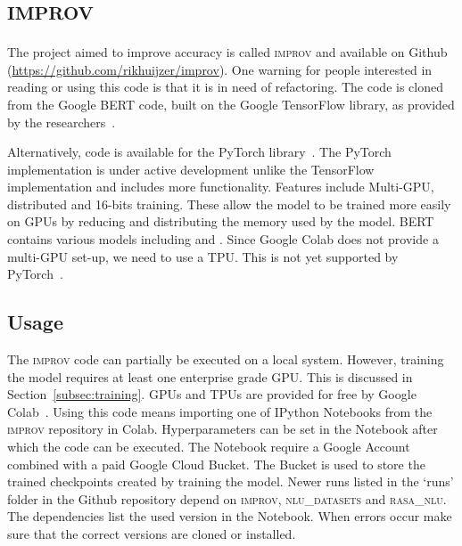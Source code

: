 \chapter{\textsc{improv}}
\label{ch:improv}
The project aimed to improve accuracy is called \textsc{improv} and available on Github (\url{https://github.com/rikhuijzer/improv}).
One warning for people interested in reading or using this code is that it is in need of refactoring.
The code is cloned from the Google BERT code, built on the Google TensorFlow library, as provided by the researchers~\citep{devlin2018github}.

Alternatively, code is available for the PyTorch library~\citep{wolf2018github}.
The PyTorch implementation is under active development unlike the TensorFlow implementation and includes more functionality.
Features include Multi-GPU, distributed and 16-bits training.
These allow the model to be trained more easily on GPUs by reducing and distributing the memory used by the model.
BERT contains various models including  and .
Since Google Colab does not provide a multi-GPU set-up, we need to use a TPU.
This is not yet supported by PyTorch~\citep{wolf2018github}.

\section{Usage}
\label{sec:improv_usage}
The \textsc{improv} code can partially be executed on a local system.
However, training the model requires at least one enterprise grade GPU.
This is discussed in Section~\ref{subsec:training}.
GPUs and TPUs are provided for free by Google Colab~\citep{google2019colab}.
Using this code means importing one of IPython Notebooks from the \textsc{improv} repository in Colab.
Hyperparameters can be set in the Notebook after which the code can be executed.
The Notebook require a Google Account combined with a paid Google Cloud Bucket.
The Bucket is used to store the trained checkpoints created by training the model.
Newer runs listed in the `runs' folder in the Github repository depend on \textsc{improv}, \textsc{nlu\_datasets} and \textsc{rasa\_nlu}.
The dependencies list the used version in the Notebook.
When errors occur make sure that the correct versions are cloned or installed.

\iffalse
\section{Overview}
\label{sec:improv_overview}
Since the code is in need of refactoring this section will only describe the most important parts of the project.
\fi

